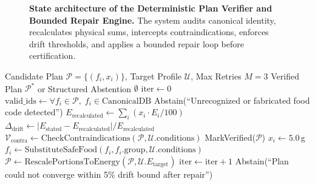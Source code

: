\documentclass[5p,times,twocolumn]{elsarticle}
\begin{document}
\begin{figure}[!htbp]
{
  }
  \caption{\textbf{State architecture of the Deterministic Plan Verifier and Bounded Repair Engine.} The system audits canonical identity, recalculates physical sums, intercepts contraindications, enforces drift thresholds, and applies a bounded repair loop before certification.}
  \label{fig:verifier_state_machine}
\end{figure}

\begin{algorithm}[!htbp]
\caption{Deterministic Post-Generation Plan Verification and Repair}
\label{alg:verification}
\small
\begin{algorithmic}[1]
\REQUIRE Candidate Plan $\mathcal{P} = \{(f_i, x_i)\}$, Target Profile $\mathcal{U}$, Max Retries $M=3$
\ENSURE Verified Plan $\mathcal{P}^*$ or Structured Abstention $\emptyset$
\STATE $\text{iter} \leftarrow 0$
  \STATE $\text{valid\_ids} \leftarrow \forall f_i \in \mathcal{P}, \; f_i \in \text{CanonicalDB}$
    \RETURN Abstain(``Unrecognized or fabricated food code detected'')
  \ENDIF
  \STATE $E_{\text{recalculated}} \leftarrow \sum_{i} (x_i \cdot E_i / 100)$
  \STATE $\Delta_{\text{drift}} \leftarrow |E_{\text{stated}} - E_{\text{recalculated}}| / E_{\text{recalculated}}$
  \STATE $\mathcal{V}_{\text{contra}} \leftarrow \text{CheckContraindications}(\mathcal{P}, \mathcal{U}.\text{conditions})$
    \RETURN MarkVerified($\mathcal{P}$)
  \ENDIF
  \STATE {}
      \STATE $x_i \leftarrow 5.0$\,g
    \ENDIF
      \STATE $f_i \leftarrow \text{SubstituteSafeFood}(f_i, f_i.\text{group}, \mathcal{U}.\text{conditions})$
    \ENDIF
  \ENDFOR
  \STATE $\mathcal{P} \leftarrow \text{RescalePortionsToEnergy}(\mathcal{P}, \mathcal{U}.E_{\text{target}})$
  \STATE $\text{iter} \leftarrow \text{iter} + 1$
\ENDWHILE
\RETURN Abstain(``Plan could not converge within 5\% drift bound after repair'')
\end{algorithmic}
\end{algorithm}
\end{document}
